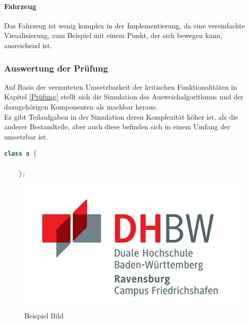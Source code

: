 \paragraph{Fahrzeug}
Das Fahrzeug ist wenig komplex in der Implementierung, da eine vereinfachte Visualisierung, zum Beispiel mit einem Punkt, der sich bewegen kann, ausreichend ist.

\subsubsection{Auswertung der Prüfung}
Auf Basis der vermuteten Umsetzbarkeit der kritischen Funktionalitäten in Kapitel \ref{Prüfung} stellt sich die Simulation des Ausweichalgorithmus und der dazugehörigen Komponenten als machbar heraus. \\
Es gibt Teilaufgaben in der Simulation deren Komplexität höher ist, als die anderer Bestandteile, aber auch diese befinden sich in einem Umfang der umsetzbar ist.\\



\begin{lstlisting}[language=C++, caption=Beispiel Listing]
    class a {

    };
\end{lstlisting}

\begin{figure}[H]
    \centering
    \includegraphics[]{graphics/DHBW_logo.jpg}
    \caption{Beispiel Bild}
    \label{fig:bsp_bild}
\end{figure}

\newpage
